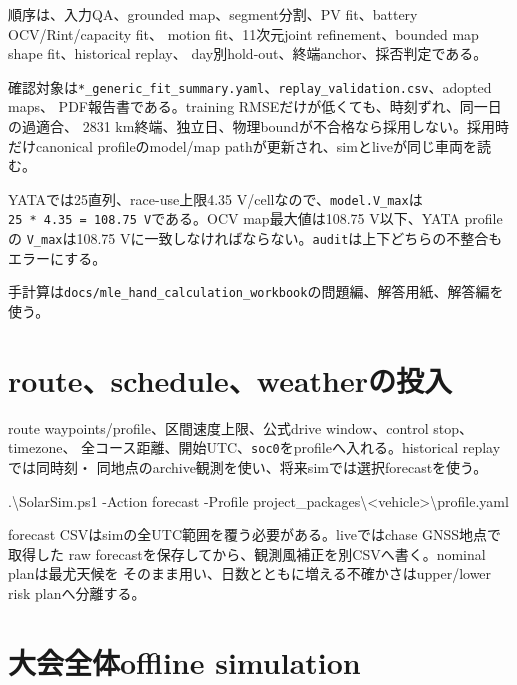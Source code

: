\documentclass[
  japanese,
  a4paper,
]{article}
\newenvironment{Shaded}{}{}
\newcommand{\FunctionTok}[1]{\textcolor[rgb]{0.02,0.16,0.49}{#1}}
\newcommand{\NormalTok}[1]{#1}
\newcommand{\OperatorTok}[1]{\textcolor[rgb]{0.40,0.40,0.40}{#1}}
\begin{document}
順序は、入力QA、grounded map、segment分割、PV fit、battery
OCV/Rint/capacity fit、 motion fit、11次元joint refinement、bounded map
shape fit、historical replay、
day別hold-out、終端anchor、採否判定である。

確認対象は\texttt{*\_generic\_fit\_summary.yaml}、\texttt{replay\_validation.csv}、adopted
maps、 PDF報告書である。training
RMSEだけが低くても、時刻ずれ、同一日の過適合、 2831
km終端、独立日、物理boundが不合格なら採用しない。採用時だけcanonical
profileのmodel/map pathが更新され、simとliveが同じ車両を読む。

YATAでは25直列、race-use上限4.35 V/cellなので、\texttt{model.V\_max}は
\texttt{25\ *\ 4.35\ =\ 108.75\ V}である。OCV map最大値は108.75
V以下、YATA profileの \texttt{V\_max}は108.75
Vに一致しなければならない。\texttt{audit}は上下どちらの不整合もエラーにする。

手計算は\texttt{docs/mle\_hand\_calculation\_workbook}の問題編、解答用紙、解答編を使う。

\section{route、schedule、weatherの投入}\label{routescheduleweatherux306eux6295ux5165}

route waypoints/profile、区間速度上限、公式drive window、control
stop、timezone、
全コース距離、開始UTC、\texttt{soc0}をprofileへ入れる。historical
replayでは同時刻・
同地点のarchive観測を使い、将来simでは選択forecastを使う。

\begin{Shaded}
\begin{Highlighting}[]
\OperatorTok{.}\NormalTok{\textbackslash{}SolarSim}\OperatorTok{.}\FunctionTok{ps1} \OperatorTok{{-}}\NormalTok{Action forecast }\OperatorTok{{-}}\NormalTok{Profile project\_packages\textbackslash{}}\OperatorTok{\textless{}}\NormalTok{vehicle}\OperatorTok{\textgreater{}}\NormalTok{\textbackslash{}profile}\OperatorTok{.}\FunctionTok{yaml}
\end{Highlighting}
\end{Shaded}

forecast CSVはsimの全UTC範囲を覆う必要がある。liveではchase
GNSS地点で取得した raw
forecastを保存してから、観測風補正を別CSVへ書く。nominal
planは最尤天候を そのまま用い、日数とともに増える不確かさはupper/lower
risk planへ分離する。

\section{大会全体offline
simulation}\label{ux5927ux4f1aux5168ux4f53offline-simulation}
\end{document}
